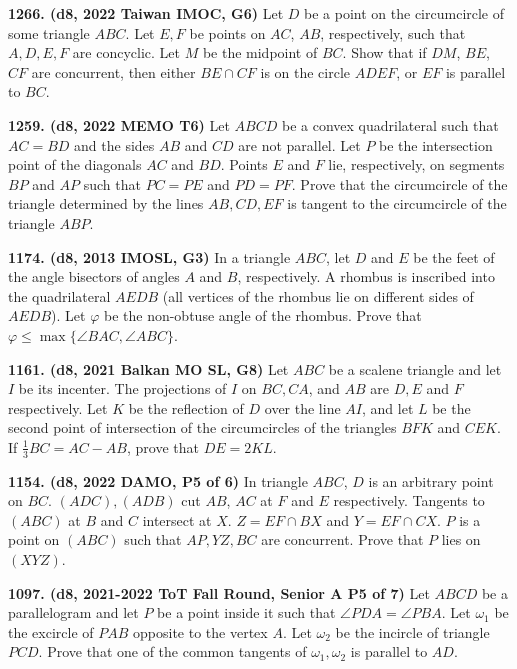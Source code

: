 \documentclass{article}
\begin{document}
\textbf{1266. (\color{red}d8\color{black}, 2022 Taiwan IMOC, G6)} Let $D$ be a point on the circumcircle of some triangle $ABC$. Let $E, F$ be points on $AC$, $AB$, respectively, such that $A,D,E,F$ are concyclic. Let $M$ be the midpoint of $BC$. Show that if $DM$, $BE$, $CF$ are concurrent, then either $BE \cap CF$ is on the circle $ADEF$, or $EF$ is parallel to $BC$.

\textbf{1259. (\color{red}d8\color{black}, 2022 MEMO T6)} Let $ABCD$ be a convex quadrilateral such that $AC = BD$ and the sides $AB$ and $CD$ are
not parallel. Let $P$ be the intersection point of the diagonals $AC$ and $BD$. Points $E$ and $F$
lie, respectively, on segments $BP$ and $AP$ such that $PC=PE$ and $PD=PF$. Prove that
the circumcircle of the triangle determined by the lines $AB, CD, EF$ is tangent to the circumcircle of the triangle $ABP$.

\textbf{1174. (\color{red}d8\color{black}, 2013 IMOSL, G3)} In a triangle $ABC$, let $D$ and $E$ be the feet of the angle bisectors of angles $A$ and $B$, respectively. A rhombus is inscribed into the quadrilateral $AEDB$ (all vertices of the rhombus lie on different sides of $AEDB$). Let $\varphi$ be the non-obtuse angle of the rhombus. Prove that $\varphi \le \max \{  \angle BAC, \angle ABC  \}$.

\textbf{1161. (\color{red}d8\color{black}, 2021 Balkan MO SL, G8)} Let $ABC$ be a scalene triangle and let $I$ be its incenter. The projections of $I$ on $BC, CA$,
and $AB$ are $D, E$ and $F$ respectively. Let $K$ be the reflection of $D$ over the line $AI$, and let
$L$ be the second point of intersection of the circumcircles of the triangles $BFK$ and $CEK$. If
$\frac{1}{3} BC = AC - AB$, prove that $DE = 2KL$.

\textbf{1154. (\color{red}d8\color{black}, 2022 DAMO, P5 of 6)} In triangle $ABC$, $D$ is an arbitrary point on $BC$. $(ADC), (ADB)$ cut $AB$, $AC$ at $F$ and $E$ respectively. Tangents to $(ABC)$ at $B$ and $C$ intersect at $X$. $Z=EF \cap BX$ and $Y=EF \cap CX$. $P$ is a point on $(ABC)$ such that $AP, YZ, BC$ are concurrent. Prove that $P$ lies on $(XYZ)$.

\textbf{1097. (\color{red}d8\color{black}, 2021-2022 ToT Fall Round, Senior A P5 of 7)} Let $ABCD$ be a parallelogram and let $P$ be a point inside it such that $\angle PDA=\angle PBA$. Let $\omega_1$ be the excircle of $PAB$ opposite to the vertex $A$. Let $\omega_2$ be the incircle of  triangle $PCD$. Prove that one of the common tangents of $\omega_1, \omega_2$ is parallel to $AD$.
\end{document}
